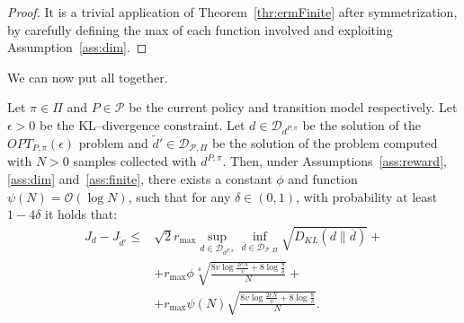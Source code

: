 \begin{proof}
	It is a trivial application of Theorem~\ref{thr:ermFinite} after symmetrization, by carefully defining the max of each function involved and exploiting Assumption~\ref{ass:dim}.
\end{proof}

We can now put all together.

\begin{theorem}
	Let $\pi \in \Pi$ and $P \in \mathcal{P}$ be the current policy and transition model respectively. Let $\epsilon > 0$ be the KL--divergence constraint. Let $d \in \mathcal{D}_{d^{P,\pi}}$ be the solution of the $OPT_{P,\pi}(\epsilon)$ problem and $\widetilde{d}' \in \mathcal{D}_{\mathcal{P}, \Pi}$ be the solution of the \rempskappahat{\epsilon} problem computed with $N>0$ samples collected with $d^{P,\pi}$. Then, under Assumptions~\ref{ass:reward}, \ref{ass:dim} and~\ref{ass:finite}, there exists a constant $\phi$ and function $\psi(N) = \mathcal{O} \left( \log N \right)$, such that for any $\delta \in (0,1)$, with probability at least $1-4\delta$ it holds that:
	\begin{align*}
		J_{d} - J_{\widetilde{d}'} \le & \sqrt{2} r_{\max} \sup_{d \in \mathcal{D}_{d^{P,\pi}}}  \inf_{\overline{d} \in \mathcal{D}_{\mathcal{P},\Pi}} \sqrt{D_{KL}( d \| \overline{d})} +\\&
		+ r_{\max} \phi \sqrt[4]{\frac{8v \log\frac{2eN}{v} + 8 \log \frac{8}{\delta}}{N}} + \\&
		+  r_{\max} \psi(N) \sqrt{\frac{8v \log\frac{2eN}{v} + 8 \log \frac{8}{\delta}}{N}}.
	\end{align*}
\end{theorem}

